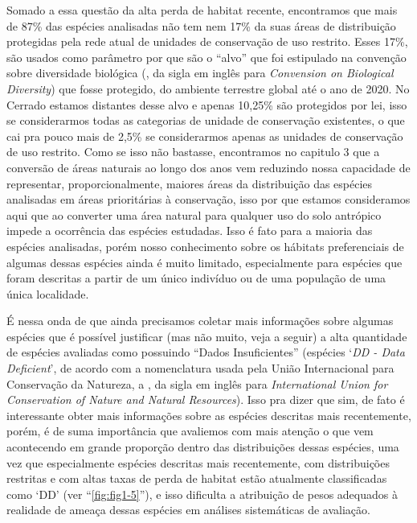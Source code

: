 \documentclass[12pt,openright,oneside,a4paper,english]{abntex2}
\begin{document}
Somado a essa questão da alta perda de habitat recente, encontramos que mais de 87\% das espécies analisadas não tem nem 17\% da suas áreas de distribuição protegidas pela rede atual de unidades de conservação de uso restrito. Esses 17\%, são usados como parâmetro por que são o “alvo” que foi estipulado na convenção sobre diversidade biológica (\citeauthor{CBD2010}, da sigla em inglês para \textit{Convension on Biological Diversity}) que fosse protegido, do ambiente terrestre global até o ano de 2020. No Cerrado estamos distantes desse alvo e apenas 10,25\% são protegidos por lei, isso se considerarmos todas as categorias de unidade de conservação existentes, o que cai pra pouco mais de 2,5\% se considerarmos apenas as unidades de conservação de uso restrito. Como se isso não bastasse, encontramos no capitulo 3 que a conversão de áreas naturais ao longo dos anos vem reduzindo nossa capacidade de representar, proporcionalmente, maiores áreas da distribuição das espécies analisadas em áreas prioritárias à conservação, isso por que estamos consideramos aqui que ao converter uma área natural para qualquer uso do solo antrópico impede a ocorrência das espécies estudadas. Isso é fato para a maioria das espécies analisadas, porém nosso conhecimento sobre os hábitats preferenciais de algumas dessas espécies ainda é muito limitado, especialmente para espécies que foram descritas a partir de um único indivíduo ou de uma população de uma única localidade.

É nessa onda de que ainda precisamos coletar mais informações sobre algumas espécies que é possível justificar (mas não muito, veja a seguir) a alta quantidade de espécies avaliadas como possuindo “Dados Insuficientes” (espécies ‘\textit{DD - Data Deficient}’, de acordo com a nomenclatura usada pela União Internacional para Conservação da Natureza, a \citeauthor{IUCN2023}, da sigla em inglês para \textit{International Union for Conservation of Nature and Natural Resources}). Isso pra dizer que sim, de fato é interessante obter mais informações sobre as espécies descritas mais recentemente, porém, é de suma importância que avaliemos com mais atenção o que vem acontecendo em grande proporção dentro das distribuições dessas espécies, uma vez que especialmente espécies descritas mais recentemente, com distribuições restritas e com altas taxas de perda de habitat estão atualmente classificadas como ‘DD’ (ver “\autoref{fig:fig1-5}”), e isso dificulta a atribuição de pesos adequados à realidade de ameaça dessas espécies em análises sistemáticas de avaliação.
\end{document}

